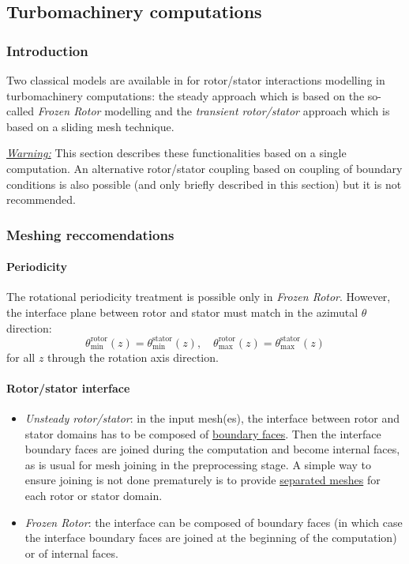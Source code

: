 \subsection{Turbomachinery computations}

\subsubsection{Introduction}

Two classical models are available in \CS for rotor/stator
interactions modelling in turbomachinery computations: the steady
approach which is based on the so-called \emph{Frozen Rotor} modelling
and the \emph{transient rotor/stator} approach which is based on a
sliding mesh technique.

\underline{\emph{Warning:}} This section describes these functionalities based on
a single \CS computation. An alternative rotor/stator coupling based
on coupling of boundary conditions is also possible (and only briefly
described in this section) but it is not recommended.

\subsubsection{Meshing reccomendations}\label{tbm_mesh}

\paragraph{Periodicity}\label{tbm_mesh_perio}

The rotational periodicity treatment is possible only in \emph{Frozen
Rotor}. However, the interface plane between rotor and stator
must match in the azimutal $\theta$ direction:
$$\theta_{\text{min}}^{\text{rotor}}(z)=\theta_{\text{min}}^{\text{stator}}(z),\quad\theta_{\text{max}}^{\text{rotor}}(z)=\theta_{\text{max}}^{\text{stator}}(z)$$
for all $z$ through the rotation axis direction.

\paragraph{Rotor/stator interface}\label{tbm_mesh_interface}
\begin{itemize}
\item \emph{Unsteady rotor/stator}: in the input mesh(es), the
  interface between rotor and stator domains has to be composed of
  \underline{boundary faces}. Then the interface boundary faces are joined
  during the computation and become internal faces, as is usual for
  mesh joining in the preprocessing stage. A simple way to ensure
  joining is not done prematurely is to provide
  \underline{separated meshes} for each rotor or stator domain.
\item \emph{Frozen Rotor}: the interface can be composed of boundary
   faces (in which case the interface boundary faces are joined at
   the beginning of the computation) or of internal faces.
\end{itemize}

